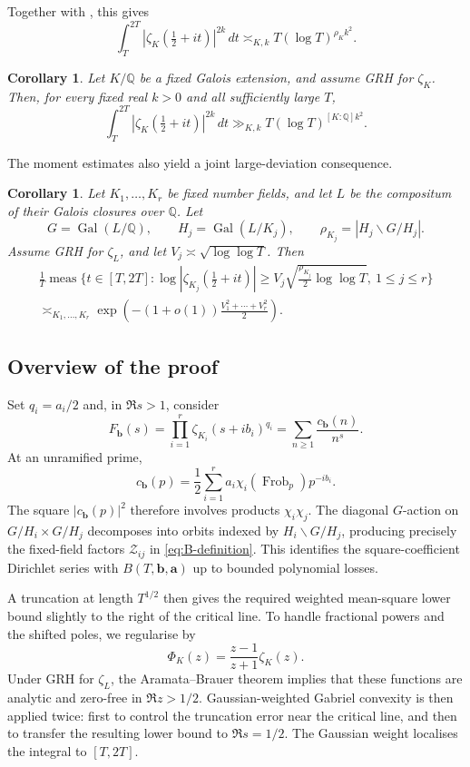 \documentclass[11pt]{amsart}
\numberwithin{equation}{section}
\theoremstyle{plain}
\newtheorem{cor}[thm]{Corollary}
\newcommand{\Q}{\mathbb{Q}}
\newcommand{\calZ}{\mathcal{Z}}
\renewcommand{\le}{\leqslant}
\renewcommand{\ge}{\geqslant}
\DeclareMathOperator{\Gal}{Gal}
\DeclareMathOperator{\Frob}{Frob}
\begin{document}
Together with \cite[Theorem~1.1]{DurkanKarakMahatab}, this gives
$$
\int_T^{2T}
\left|\zeta_K\left(\tfrac12+it\right)\right|^{2k}\,dt
\asymp_{K,k}
T(\log T)^{\rho_Kk^2}.
$$

\begin{cor}\label{cor:galois}
Let $K/\Q$ be a fixed Galois extension, and assume GRH for $\zeta_K$.
Then, for every fixed real $k>0$ and all sufficiently large $T$,
\begin{equation}\label{eq:galois}
\int_T^{2T}
\left|\zeta_K\left(\tfrac12+it\right)\right|^{2k}\,dt
\gg_{K,k}
T(\log T)^{[K:\Q]k^2}.
\end{equation}
\end{cor}

The moment estimates also yield a joint large-deviation consequence.

\begin{cor}
Let $K_1,\ldots,K_r$ be fixed number fields, and let $L$ be the compositum
of their Galois closures over $\Q$.  Let
$$
G=\Gal(L/\Q),\qquad
H_j=\Gal(L/K_j),\qquad
\rho_{K_j}=|H_j\backslash G/H_j|.
$$
Assume GRH for $\zeta_L$, and let
$V_j\asymp\sqrt{\log\log T}$.  Then
\begin{align*}
\frac1T\operatorname{meas}\Bigg\{
t\in[T,2T]:
\log\left|\zeta_{K_j}\left(\frac12+it\right)\right|
\ge
V_j\sqrt{\frac{\rho_{K_j}}2\log\log T},
\ 1\le j\le r
\Bigg\}
\\
\asymp_{K_1,\ldots,K_r}
\exp\left(
-(1+o(1))
\frac{V_1^2+\cdots+V_r^2}{2}
\right).
\end{align*}
\end{cor}

\subsection{Overview of the proof}

Set $q_i=a_i/2$ and, in $\Re s>1$, consider
\[
F_{\mathbf b}(s)
=
\prod_{i=1}^r\zeta_{K_i}(s+ib_i)^{q_i}
=
\sum_{n\ge1}\frac{c_{\mathbf b}(n)}{n^s}.
\]
At an unramified prime,
\[
c_{\mathbf b}(p)
=
\frac12\sum_{i=1}^r
a_i\chi_i(\Frob_p)p^{-ib_i}.
\]
The square $|c_{\mathbf b}(p)|^2$ therefore involves products
$\chi_i\chi_j$.  The diagonal $G$-action on
$G/H_i\times G/H_j$ decomposes into orbits indexed by
$H_i\backslash G/H_j$, producing precisely the fixed-field factors
$\calZ_{ij}$ in \eqref{eq:B-definition}.  This identifies the
square-coefficient Dirichlet series with $B(T,\mathbf b,\mathbf a)$ up to
bounded polynomial losses.

A truncation at length $T^{1/2}$ then gives the required weighted
mean-square lower bound slightly to the right of the critical line.  To
handle fractional powers and the shifted poles, we regularise by
\[
\Phi_K(z)=\frac{z-1}{z+1}\zeta_K(z).
\]
Under GRH for $\zeta_L$, the Aramata--Brauer theorem implies that these
functions are analytic and zero-free in $\Re z>1/2$.  Gaussian-weighted
Gabriel convexity is then applied twice: first to control the truncation
error near the critical line, and then to transfer the resulting lower
bound to $\Re s=1/2$.  The Gaussian weight localises the integral to
$[T,2T]$.
\end{document}
